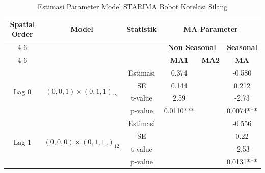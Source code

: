 \begin{table}[H]
    \centering
    \scriptsize
    \caption{Estimasi Parameter Model STARIMA Bobot Korelasi Silang}
    \label{table:estimasi-paramater-starima-cross}
    \renewcommand{\arraystretch}{1.3}

    \begin{tabular}{|c|c|c|c|c|c|}
        \hline
        \multirow{3}{*}{\textbf{Spatial Order}} &
        \multirow{3}{*}{\textbf{Model}} &
        \multirow{3}{*}{\textbf{Statistik}} &
        \multicolumn{3}{c|}{\textbf{MA Parameter}} \\ \cline{4-6}

        & & &
        \multicolumn{2}{c|}{\textbf{Non Seasonal}} &
        \textbf{Seasonal} \\ \cline{4-6}

        & & &
        \textbf{MA1} & \textbf{MA2} & \textbf{MA} \\
        \hline

        \multirow{4}{*}{Lag 0}
        & \multirow{4}{*}{$(0,0,1)\times(0,1,1)_{12}$}
        & Estimasi & 0.374 &  & -0.580 \\ \cline{3-6}
        & & SE      & 0.144 &  & 0.212  \\ \cline{3-6}
        & & t-value & 2.59  &  & -2.73  \\ \cline{3-6}
        & & p-value & 0.0110*** &  & 0.0074*** \\
        \hline

        \multirow{4}{*}{Lag 1}
        & \multirow{4}{*}{$(0,0,0)\times(0,1,1_{0})_{12}$}
        & Estimasi &  &  & -0.556 \\ \cline{3-6}
        & & SE      &  &  & 0.22   \\ \cline{3-6}
        & & t-value &  &  & -2.53  \\ \cline{3-6}
        & & p-value &  &  & 0.0131*** \\
        \hline

    \end{tabular}
\end{table}